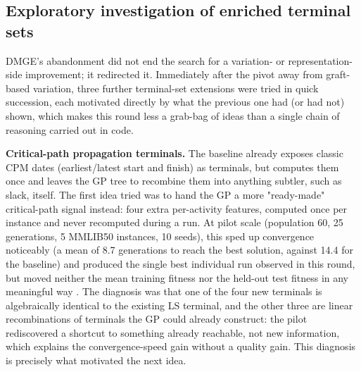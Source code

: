 \subsection{Exploratory investigation of enriched terminal sets}
\label{subsec:pilot-terminals}

DMGE's abandonment did not end the search for a variation- or
representation-side improvement; it redirected it. Immediately after the
pivot away from graft-based variation, three further terminal-set
extensions were tried in quick succession, each motivated directly by what
the previous one had (or had not) shown, which makes this round less a
grab-bag of ideas than a single chain of reasoning carried out in code.

\textbf{Critical-path propagation terminals.} The baseline already exposes
classic CPM dates (earliest/latest start and finish) as terminals, but
computes them once and leaves the GP tree to recombine them into anything
subtler, such as slack, itself. The first idea tried was to hand the GP a
more "ready-made" critical-path signal instead: four extra per-activity
features, computed once per instance and never recomputed during a run.
 At pilot scale (population 60, 25 generations, 5
MMLIB50 instances, 10 seeds), this sped up convergence noticeably (a mean
of 8.7 generations to reach the best solution, against 14.4 for the
baseline) and produced the single best individual run observed in this
round, but moved neither the mean training fitness nor the held-out test
fitness in any meaningful way . The diagnosis was
that one of the four new terminals is algebraically identical to the
existing LS terminal, and the other three are linear recombinations of
terminals the GP could already construct: the pilot rediscovered a shortcut
to something already reachable, not new information, which explains the
convergence-speed gain without a quality gain. This diagnosis is precisely
what motivated the next idea.

